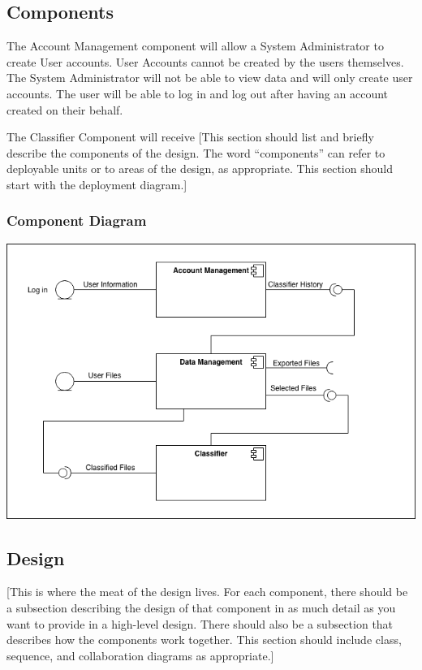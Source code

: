 \documentclass[12pt,oneside,letterpaper]{article}
\begin{document}
\subsection{Components}
The Account Management component will allow a System Administrator to create User accounts. User Accounts cannot be created by the users themselves. The System Administrator will not be able to view data and will only create user accounts. The user will be able to log in and log out after having an account created on their behalf.



The Classifier Component will receive 
[This section should list and briefly describe the components of the design.  The word ``components'' can refer to deployable units or to areas of the design, as appropriate. This section should start with the deployment diagram.]

\subsubsection{Component Diagram}
\includegraphics[scale = 0.7]{Component_Diagram.png}
\begingroup
{}
\endgroup


\subsection{Design}
[This is where the meat of the design lives.  For each component, there should be a subsection describing the design of that component in as much detail as you want to provide in a high-level design.  There should also be a subsection that describes how the components work together. This section should include class, sequence, and collaboration diagrams as appropriate.]
\end{document}
